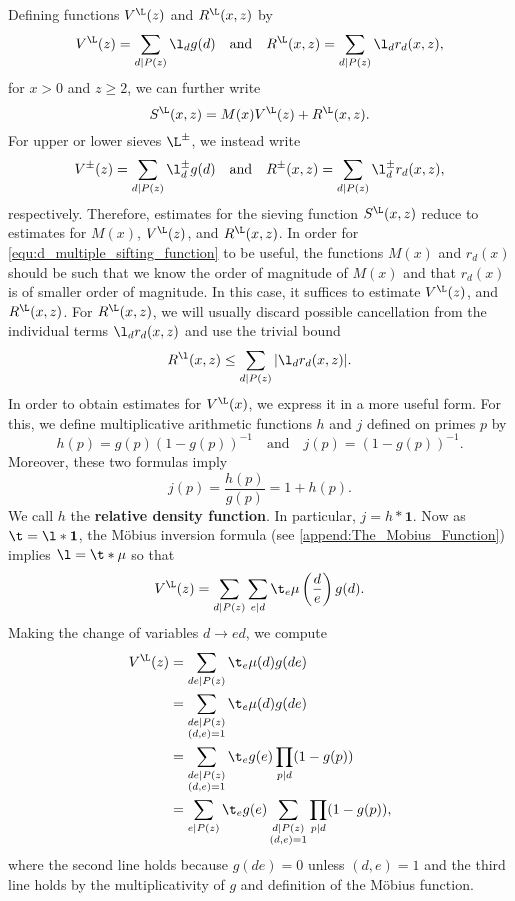     Defining functions $V^{\L}(z)$ and $R^{\L}(x,z)$ by
     \[
      V^{\L}(z) = \sum_{d \mid P(z)}\l_{d}g(d) \quad \text{and} \quad R^{\L}(x,z) = \sum_{d \mid P(z)}\l_{d}r_{d}(x,z),
    \]
    for $x > 0$ and $z \ge 2$, we can further write
    \[
      S^{\L}(x,z) = M(x)V^{\L}(z)+R^{\L}(x,z).
    \]
    For upper or lower sieves $\L^{\pm}$, we instead write
     \[
      V^{\pm}(z) = \sum_{d \mid P(z)}\l_{d}^{\pm}g(d) \quad \text{and} \quad R^{\pm}(x,z) = \sum_{d \mid P(z)}\l_{d}^{\pm}r_{d}(x,z),
    \]
    respectively. Therefore, estimates for the sieving function $S^{\L}(x,z)$ reduce to estimates for $M(x)$, $V^{\L}(z)$, and $R^{\L}(x,z)$. In order for \cref{equ:d_multiple_sifting_function} to be useful, the functions $M(x)$ and $r_{d}(x)$ should be such that we know the order of magnitude of $M(x)$ and that $r_{d}(x)$ is of smaller order of magnitude. In this case, it suffices to estimate $V^{\L}(z)$, and $R^{\L}(x,z)$. For $R^{\L}(x,z)$, we will usually discard possible cancellation from the individual terms $\l_{d}r_{d}(x,z)$ and use the trivial bound
    \[
      R^{\l}(x,z) \le \sum_{d \mid P(z)}|\l_{d}r_{d}(x,z)|.
    \]
    In order to obtain estimates for $V^{\L}(x)$, we express it in a more useful form. For this, we define multiplicative arithmetic functions $h$ and $j$ defined on primes $p$ by
    \[
      h(p) = g(p)(1-g(p))^{-1} \quad \text{and} \quad j(p) = (1-g(p))^{-1}.
    \]
    Moreover, these two formulas imply
    \[
      j(p) = \frac{h(p)}{g(p)} = 1+h(p).
    \]
    We call $h$ the \textbf{relative density function}. In particular, $j = h \ast \mathbf{1}$. Now as $\t = \l \ast \mathbf{1}$, the M\"obius inversion formula (see \cref{append:The_Mobius_Function}) implies $\l = \t \ast \mu$ so that
    \[
      V^{\L}(z) = \sum_{d \mid P(z)}\sum_{e \mid d}\t_{e}\mu\left(\frac{d}{e}\right)g(d).
    \]
    Making the change of variables $d \to ed$, we compute
    \begin{align*}
      V^{\L}(z) &= \sum_{de \mid P(z)}\t_{e}\mu(d)g(de) \\
      &= \sum_{\substack{de \mid P(z) \\ (d,e) = 1}}\t_{e}\mu(d)g(de) \\
      &= \sum_{\substack{de \mid P(z) \\ (d,e) = 1}}\t_{e}g(e)\prod_{p \mid d}(1-g(p)) \\
      &= \sum_{e \mid P(z)}\t_{e}g(e)\sum_{\substack{d \mid P(z) \\ (d,e) = 1}}\prod_{p \mid d}(1-g(p)),
    \end{align*}
    where the second line holds because $g(de) = 0$ unless $(d,e) = 1$ and the third line holds by the multiplicativity of $g$ and definition of the M\"obius function.
  \section{}
